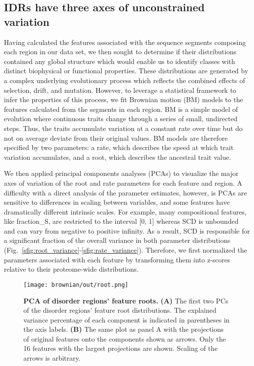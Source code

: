 \subsection{IDRs have three axes of unconstrained variation}
Having calculated the features associated with the sequence segments composing each region in our data set, we then sought to determine if their distributions contained any global structure which would enable us to identify classes with distinct biophysical or functional properties. These distributions are generated by a complex underlying evolutionary process which reflects the combined effects of selection, drift, and mutation. However, to leverage a statistical framework to infer the properties of this process, we fit Brownian motion (BM) models to the features calculated from the segments in each region. BM is a simple model of evolution where continuous traits change through a series of small, undirected steps. Thus, the traits accumulate variation at a constant rate over time but do not on average deviate from their original values. BM models are therefore specified by two parameters: a rate, which describes the speed at which trait variation accumulates, and a root, which describes the ancestral trait value.

We then applied principal components analyses (PCAs) to visualize the major axes of variation of the root and rate parameters for each feature and region. A difficulty with a direct analysis of the parameter estimates, however, is PCAs are sensitive to differences in scaling between variables, and some features have dramatically different intrinsic scales. For example, many compositional features, like fraction\_S, are restricted to the interval [0, 1] whereas SCD is unbounded and can vary from negative to positive infinity. As a result, SCD is responsible for a significant fraction of the overall variance in both parameter distributions (Fig.~\ref{sfig:root_variance}-\ref{sfig:rate_variance}). Therefore, we first normalized the parameters associated with each feature by transforming them into z-scores relative to their proteome-wide distributions.

\begin{figure}[h!]
\texttt{[image: brownian/out/root.png]}
\centering
\caption{\textbf{PCA of disorder regions' feature roots.}
\textbf{(A)} The first two PCs of the disorder regions' feature root distributions. The explained variance percentage of each component is indicated in parentheses in the axis labels. \textbf{(B)} The same plot as panel A with the projections of original features onto the components shown as arrows. Only the 16 features with the largest projections are shown. Scaling of the arrows is arbitrary.}
\label{fig:root}
\end{figure}

